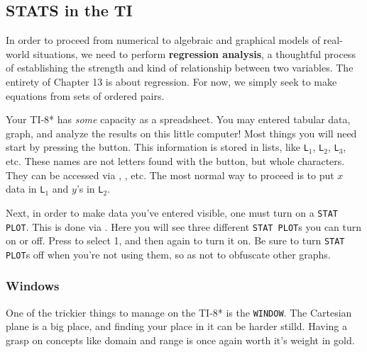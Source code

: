 
\subsection{STATS in the TI}



In order to proceed from numerical to algebraic and graphical models of
real-world situations, we need to perform \textbf{regression analysis}, a thoughtful
process of establishing the strength and kind of relationship between two
variables.  The entirety of Chapter 13 is about regression.
For now, we simply seek to make equations from sets of ordered pairs.

Your TI-8* has \emph{some} capacity as a spreadsheet.  You may entered tabular data, 
graph, and analyze the results on this little computer!  Most things you will need start by
pressing the \Touche[style=function,principal={STAT}] button.
This information is stored in lists, like \texttt{L$_1$}, \texttt{L$_2$}, \texttt{L$_3$}, etc.  
These names are not letters found with the \Touche[style=function,principal={\small ALPHA}]
button, but whole characters.  They can be accessed via \Touche[style=function,principal={2ND}]
\Touche[style=number, principal=1], \Touche[style=function,principal={2ND}] 
\Touche[style=number, principal=2], etc.  The most normal way to proceed is to put $x$ 
data in \texttt{L$_1$} and $y$'s in \texttt{L$_2$}.


Next, in order to make data you've entered visible, one must turn on a \texttt{STAT PLOT}.
This is done via \Touche[style=function,principal=2ND] \Touche[style=function,principal=Y=].
Here you will see three different \texttt{STAT PLOT}s you can turn on or off.  Press
\Touche[style=function,principal={\small ENTER}] to select 1, and then again to turn it on.
Be sure to turn \texttt{STAT PLOT}s off when you're not using them, so as not to obfuscate
other graphs.


\subsubsection{Windows}
One of the trickier things to manage on the TI-8* is the \texttt{WINDOW}.  The Cartesian plane is 
a big place, and finding your place in it can be harder stilld.  Having a grasp
on concepts like domain and range is once again worth it's weight in gold.

